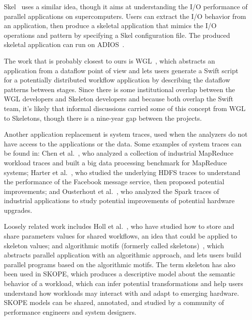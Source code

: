 \documentclass[preprint,12pt]{elsarticle}
\begin{document}
Skel~\cite{Skel} uses a similar idea, though it aims at understanding the I/O performance of parallel applications on supercomputers. Users can extract 
the I/O behavior from an application, then produce a skeletal application that mimics the I/O operations and pattern by specifying
a Skel configuration file. The produced skeletal application can run on ADIOS~\cite{ADIOS}. 

The work that is probably closest to ours is WGL~\cite{WGL}, which abstracts an application from a dataflow point of view and lets users generate a Swift script for a potentially distributed workflow application by 
describing the dataflow patterns between stages.  Since there is some institutional overlap between
the WGL developers and Skeleton developers and because both overlap the Swift team, it's likely that informal discussions carried some of this concept from WGL to Skeletons, though there is a nine-year gap between the projects.

Another application replacement is system traces, used when the analyzers do not have access to the applications or the data.  Some examples of system traces can be found in:
Chen et al.~\cite{MRTraces2012}, who analyzed a collection of industrial MapReduce workload traces and built a big data processing benchmark for MapReduce systems;
Harter et al.~\cite{HDFSTraces2014}, who studied the underlying HDFS traces to understand the performance of the Facebook message service, then proposed potential improvements; and
Ousterhout et al.~\cite{SparkTrace2015}, who analyzed the Spark traces of industrial applications to study potential improvements of potential hardware upgrades.

Loosely related work includes Holl et al.~\cite{Holl:2013:SSS:2534248.2534251}, who have studied how to store and share parameters values for shared workflows, an idea that could be applied to skeleton values; and algorithmic motifs (formerly called skeletons)~\cite{foster1990parallel}, which abstracts parallel application with an algorithmic approach, and lets users build parallel programs based on the algorithmic motifs.  The term skeleton has also been used in SKOPE, which produces a descriptive model about the semantic behavior of a workload, which can infer potential transformations and help users understand how workloads may interact with and adapt to emerging hardware. SKOPE models can be shared, annotated, and studied by a community of performance engineers and system designers.
\end{document}
